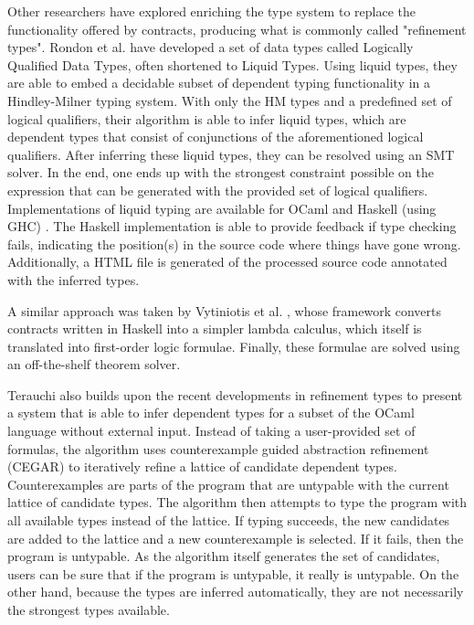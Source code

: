 \documentclass[10pt]{report}
\begin{document}
Other researchers have explored enriching the type system to replace the functionality offered by contracts, producing what is commonly called "refinement types".
Rondon et al. \cite{rondon2008liquid} have developed a set of data types called Logically Qualified Data Types, often shortened to Liquid Types.
Using liquid types, they are able to embed a decidable subset of dependent typing functionality in a Hindley-Milner typing system.
With only the HM types and a predefined set of logical qualifiers, their algorithm is able to infer liquid types, which are dependent types that consist of conjunctions of the aforementioned logical qualifiers.
After inferring these liquid types, they can be resolved using an SMT solver.
In the end, one ends up with the strongest constraint possible on the expression that can be generated with the provided set of logical qualifiers.
Implementations of liquid typing are available for OCaml \cite{rondon2008liquid} and Haskell (using GHC) \cite{rondon2013refinement}.
The Haskell implementation is able to provide feedback if type checking fails, indicating the position(s) in the source code where things have gone wrong.
Additionally, a HTML file is generated of the processed source code annotated with the inferred types.

A similar approach was taken by Vytiniotis et al. \cite{Vytiniotis:2013ww}, whose framework converts contracts written in Haskell into a simpler lambda calculus, which itself is translated into first-order logic formulae.
Finally, these formulae are solved using an off-the-shelf theorem solver.

Terauchi \cite{terauchi2010dependent} also builds upon the recent developments in refinement types to present a system that is able to infer dependent types for a subset of the OCaml language without external input.
Instead of taking a user-provided set of formulas, the algorithm uses counterexample guided abstraction refinement (CEGAR) to iteratively refine a lattice of candidate dependent types.
Counterexamples are parts of the program that are untypable with the current lattice of candidate types.
The algorithm then attempts to type the program with all available types instead of the lattice.
If typing succeeds, the new candidates are added to the lattice and a new counterexample is selected.
If it fails, then the program is untypable.
As the algorithm itself generates the set of candidates, users can be sure that if the program is untypable, it really is untypable.
On the other hand, because the types are inferred automatically, they are not necessarily the strongest types available.
\end{document}
